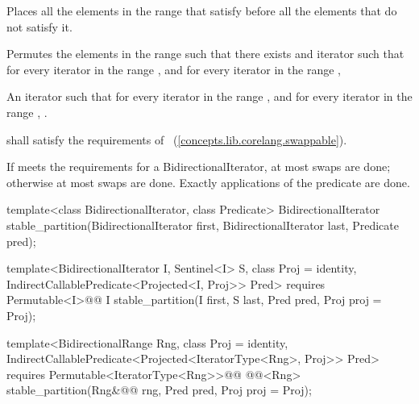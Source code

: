 \begin{itemdescr}
\pnum
\begin{removedblock}
\effects Places all the elements in the range  that satisfy
 before all the elements that do not satisfy it.
\end{removedblock}

\begin{addedblock}
\effects Permutes the elements in the range  such that there exists and iterator 
such that for every iterator  in the range 
, and for every iterator  in the
range , 
\end{addedblock}

\pnum
\returns An iterator  such that for every iterator  in the range 
,
and for every iterator  in the range ,
.

\begin{removedblock}
\pnum
\requires
{} shall satisfy the requirements of
~(\ref{concepts.lib.corelang.swappable}).
\end{removedblock}

\pnum
\complexity If  meets the requirements for a BidirectionalIterator, at most
 swaps are done; otherwise at most  swaps
are done. Exactly  applications of the predicate are done.
\end{itemdescr}

%
\begin{removedblock}
\begin{itemdecl}
template<class BidirectionalIterator, class Predicate>
  BidirectionalIterator
    stable_partition(BidirectionalIterator first,
                     BidirectionalIterator last, Predicate pred);
\end{itemdecl}
\end{removedblock}
\begin{addedblock}
\begin{itemdecl}
template<BidirectionalIterator I, Sentinel<I> S, class Proj = identity,
    IndirectCallablePredicate<Projected<I, Proj>> Pred>
  requires Permutable<I>@\newtxt{()}@
  I stable_partition(I first, S last, Pred pred, Proj proj = Proj{});

template<BidirectionalRange Rng, class Proj = identity,
    IndirectCallablePredicate<Projected<IteratorType<Rng>, Proj>> Pred>
  requires Permutable<IteratorType<Rng>>@\newtxt{()}@
  @@<Rng>
    stable_partition(Rng&@\newtxt{\&}@ rng, Pred pred, Proj proj = Proj{});
\end{itemdecl}
\end{addedblock}

